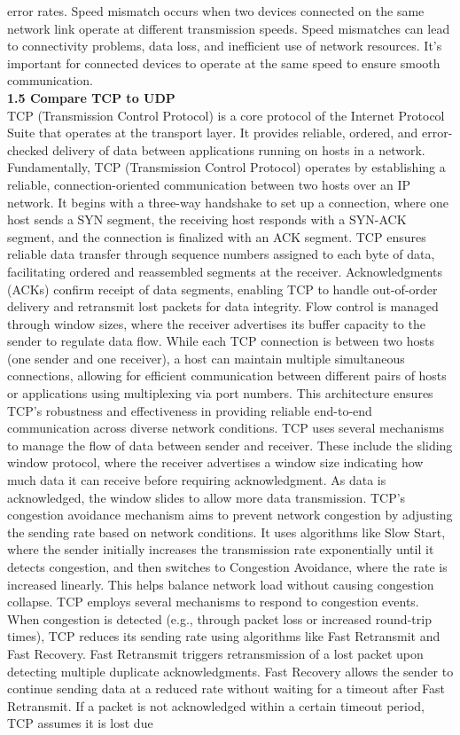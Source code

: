 \documentclass{article}
\begin{document}
error rates. Speed mismatch occurs when two devices connected on the same network link operate at different transmission speeds. Speed mismatches can lead to connectivity problems, data loss, and inefficient use of network resources. It's important for connected devices to operate at the same speed to ensure smooth communication.\\
  	
\noindent\textbf{1.5 Compare TCP to UDP}\\

TCP (Transmission Control Protocol) is a core protocol of the Internet Protocol Suite that operates at the transport layer. It provides reliable, ordered, and error-checked delivery of data between applications running on hosts in a network. Fundamentally, TCP (Transmission Control Protocol) operates by establishing a reliable, connection-oriented communication between two hosts over an IP network. It begins with a three-way handshake to set up a connection, where one host sends a SYN segment, the receiving host responds with a SYN-ACK segment, and the connection is finalized with an ACK segment. TCP ensures reliable data transfer through sequence numbers assigned to each byte of data, facilitating ordered and reassembled segments at the receiver. Acknowledgments (ACKs) confirm receipt of data segments, enabling TCP to handle out-of-order delivery and retransmit lost packets for data integrity. Flow control is managed through window sizes, where the receiver advertises its buffer capacity to the sender to regulate data flow. While each TCP connection is between two hosts (one sender and one receiver), a host can maintain multiple simultaneous connections, allowing for efficient communication between different pairs of hosts or applications using multiplexing via port numbers. This architecture ensures TCP's robustness and effectiveness in providing reliable end-to-end communication across diverse network conditions. TCP uses several mechanisms to manage the flow of data between sender and receiver. These include the sliding window protocol, where the receiver advertises a window size indicating how much data it can receive before requiring acknowledgment. As data is acknowledged, the window slides to allow more data transmission. TCP's congestion avoidance mechanism aims to prevent network congestion by adjusting the sending rate based on network conditions. It uses algorithms like Slow Start, where the sender initially increases the transmission rate exponentially until it detects congestion, and then switches to Congestion Avoidance, where the rate is increased linearly. This helps balance network load without causing congestion collapse. TCP employs several mechanisms to respond to congestion events. When congestion is detected (e.g., through packet loss or increased round-trip times), TCP reduces its sending rate using algorithms like Fast Retransmit and Fast Recovery. Fast Retransmit triggers retransmission of a lost packet upon detecting multiple duplicate acknowledgments. Fast Recovery allows the sender to continue sending data at a reduced rate without waiting for a timeout after Fast Retransmit. If a packet is not acknowledged within a certain timeout period, TCP assumes it is lost due 
\end{document}
